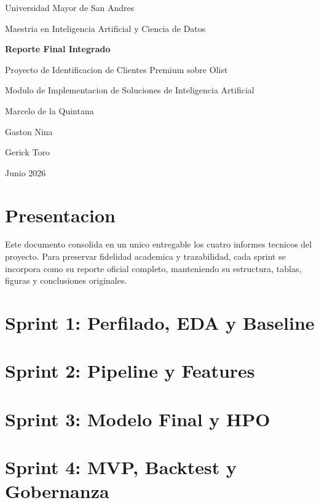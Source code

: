 \documentclass[letterpaper,12pt]{article}
\begin{document}
\begin{titlepage}
    \centering
    {\Large Universidad Mayor de San Andres\par}
    \vspace{0.5cm}
    {\large Maestria en Inteligencia Artificial y Ciencia de Datos\par}
    \vspace{1.5cm}
    {\Huge \textbf{Reporte Final Integrado}\par}
    \vspace{0.4cm}
    {\Large Proyecto de Identificacion de Clientes Premium sobre Olist\par}
    \vspace{1.5cm}
    {\large Modulo de Implementacion de Soluciones de Inteligencia Artificial\par}
    \vspace{1.5cm}
    {\large
        Marcelo de la Quintana\par
        Gaston Nina\par
        Gerick Toro\par
    }
    \vfill
    {\large Junio 2026\par}
\end{titlepage}

\tableofcontents
\newpage

\section*{Presentacion}
Este documento consolida en un unico entregable los cuatro informes tecnicos del proyecto. Para preservar fidelidad academica y trazabilidad, cada sprint se incorpora como su reporte oficial completo, manteniendo su estructura, tablas, figuras y conclusiones originales.

\section{Sprint 1: Perfilado, EDA y Baseline}


\section{Sprint 2: Pipeline y Features}


\section{Sprint 3: Modelo Final y HPO}


\section{Sprint 4: MVP, Backtest y Gobernanza}

\end{document}
